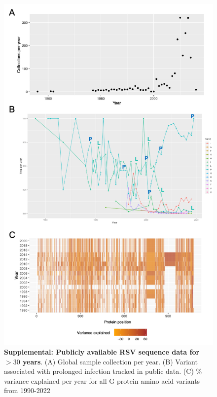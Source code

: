 \documentclass{article} %
\begin{document}
\begin{figure}[ht] \hspace{-0.5cm} \begin{center}
    \includegraphics[scale=0.6]{S2}
	\caption{\textbf{Supplemental: Publicly available RSV sequence data for $>30$ years}. (A) Global sample collection per year. (B) Variant associated with prolonged infection tracked in public data. (C) \% variance explained per year for all G protein amino acid variants from 1990-2022} 
	\label{fig:S2} \end{center}
\end{figure}
\end{document}
